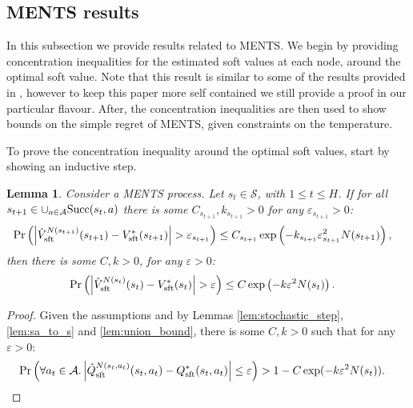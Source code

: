\documentclass{article}
\newcommand{\cl}[1]{\mathcal{#1}}
\newcommand{\Vst}[2]{\hat{V}^{#2}_{\textnormal{sft}}(#1)}
\newcommand{\Vss}[1]{V^*_{\textnormal{sft}}(#1)}
\newcommand{\Qst}[3]{\hat{Q}^{#3}_{\textnormal{sft}}(#1,#2)}
\newcommand{\Qss}[2]{Q^*_{\textnormal{sft}}(#1,#2)}
\newcommand{\suc}[1]{\cup_{a\in\cl{A}}\textnormal{Succ}(#1,a)}
\theoremstyle{plain}
\newtheorem{lemma}[theorem]{Lemma}
\begin{document}
\begin{appendices}
    
    
    
    
    
    
    
    
    \subsection{MENTS results} \label{app:ments_results}
    
        In this subsection we provide results related to MENTS. We begin by providing concentration inequalities for the estimated soft values at each node, around the optimal soft value. Note that this result is similar to some of the results provided in , however to keep this paper more self contained we still provide a proof in our particular flavour. After, the concentration inequalities are then used to show bounds on the simple regret of MENTS, given constraints on the temperature.
        
        To prove the concentration inequality around the optimal soft values, start by showing an inductive step.










    
        \begin{lemma} \label{lem:ments_val_induction_step}
            Consider a MENTS process. Let $s_t\in\cl{S}$, with $1\leq t \leq H$. If for all $s_{t+1}\in\suc{s_t}$ there is some $C_{s_{t+1}},k_{s_{t+1}}>0$ for any $\varepsilon_{s_{t+1}}>0$:
            \begin{align}
                \Pr\left(\left| \Vst{s_{t+1}}{N(s_{t+1})} - \Vss{s_{t+1}} \right| > \varepsilon_{s_{t+1}} \right) 
                    &\leq C_{s_{t+1}}\exp\left( -k_{s_{t+1}}\varepsilon_{s_{t+1}}^2 N(s_{t+1}) \right), 
            \end{align}
            then there is some $C,k>0$, for any $\varepsilon>0$:
            \begin{align}
                \Pr\left(\left| \Vst{s_{t}}{N(s_{t})} - \Vss{s_{t}} \right| > \varepsilon \right) 
                    &\leq C\exp\left( -k\varepsilon^2 N(s_{t}) \right).
            \end{align}
        \end{lemma}
        
        \begin{proof}
            Given the assumptions and by Lemmas \ref{lem:stochastic_step}, \ref{lem:sa_to_s} and \ref{lem:union_bound}, there is some $C,k>0$ such that for any $\varepsilon>0$:
            \begin{align}
                \Pr\left(\forall a_t\in\cl{A}. \left|\Qst{s_t}{a_t}{N(s_t,a_t)}-\Qss{s_t}{a_t}\right|\leq \varepsilon\right) &> 1-C \exp(-k \varepsilon^2 N(s_t)).
            \end{align}
            

\end{proof}
\end{appendices}
\end{document}
